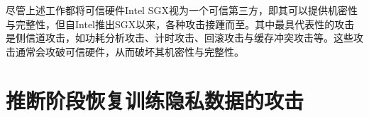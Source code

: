 尽管上述工作都将可信硬件Intel SGX视为一个可信第三方，即其可以提供机密性与完整性，但自Intel推出SGX以来，各种攻击接踵而至。其中最具代表性的攻击是侧信道攻击，如功耗分析攻击、计时攻击、回滚攻击与缓存冲突攻击等\cite{SGX_Exposure, High_Resolution_Side_Channels, Cache_Attack_SGX, CacheZoom, SGX_Cache, mem_side_hazard, PMFaultFA, VoltJockeyAN}。这些攻击通常会攻破可信硬件，从而破坏其机密性与完整性。

%
%
%



\section{推断阶段恢复训练隐私数据的攻击}\label{chap3_CMDD_FT_Exp}

